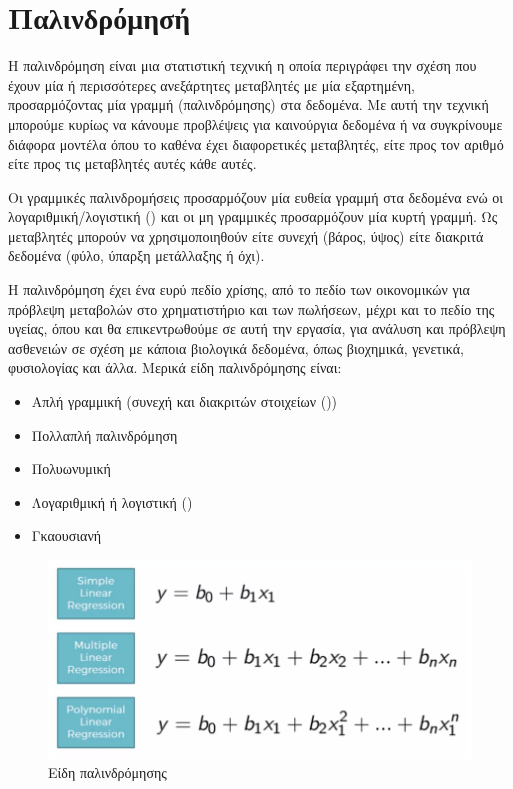 \newpage
\section{Παλινδρόμησή}
Η παλινδρόμηση είναι μια στατιστική τεχνική η οποία περιγράφει την σχέση που έχουν μία ή
περισσότερες ανεξάρτητες μεταβλητές με μία εξαρτημένη, προσαρμόζοντας μία γραμμή
(παλινδρόμησης) στα δεδομένα. Με αυτή την τεχνική μπορούμε κυρίως να κάνουμε
προβλέψεις για καινούργια δεδομένα ή να συγκρίνουμε διάφορα μοντέλα όπου το καθένα
έχει διαφορετικές μεταβλητές, είτε προς τον αριθμό είτε προς τις μεταβλητές αυτές κάθε
αυτές.

Οι γραμμικές παλινδρομήσεις προσαρμόζουν μία ευθεία γραμμή στα δεδομένα ενώ
οι λογαριθμική/λογιστική () και οι μη γραμμικές προσαρμόζουν μία κυρτή γραμμή. Ως
μεταβλητές μπορούν να χρησιμοποιηθούν είτε συνεχή (βάρος, ύψος) είτε διακριτά δεδομένα
(φύλο, ύπαρξη μετάλλαξης ή όχι).

Η παλινδρόμηση έχει ένα ευρύ πεδίο χρίσης, από το πεδίο
των οικονομικών για πρόβλεψη μεταβολών στο χρηματιστήριο και των πωλήσεων, μέχρι και
το πεδίο της υγείας, όπου και θα επικεντρωθούμε σε αυτή την εργασία, για ανάλυση και
πρόβλεψη ασθενειών σε σχέση με κάποια βιολογικά δεδομένα, όπως βιοχημικά, γενετικά,
φυσιολογίας και άλλα. Μερικά είδη παλινδρόμησης είναι:
\begin{itemize}
    \item Απλή γραμμική (συνεχή και διακριτών στοιχείων ())
    \item Πολλαπλή παλινδρόμηση
    \item Πολυωνυμική
    \item Λογαριθμική ή λογιστική ()
    \item Γκαουσιανή
\end{itemize}

\begin{figure}[H]
    \centering
    \includegraphics[width=1\textwidth]{images/Regression.png}
    \caption{Είδη παλινδρόμησης}
\end{figure}
